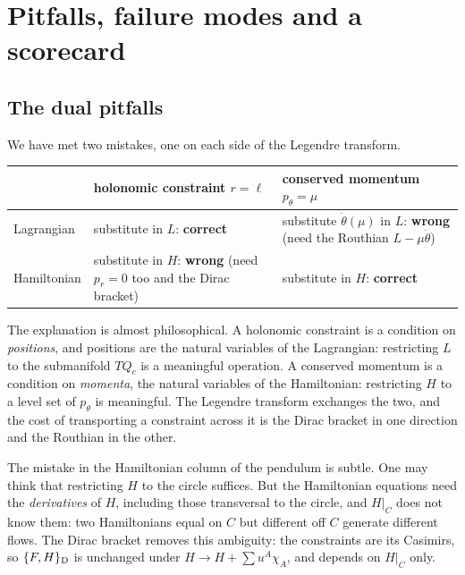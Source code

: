 \section{Pitfalls, failure modes and a scorecard}\label{rd:sec:dual}

\subsection{The dual pitfalls}\label{rd:sec:pitfalls}

We have met two mistakes, one on each side of the Legendre transform.

\begin{center}
\renewcommand{\arraystretch}{1.3}
\begin{tabular}{l|p{4.9cm}|p{4.9cm}}
 & holonomic constraint $r=\ell$ & conserved momentum $p_\theta=\mu$\\ \hline
Lagrangian & substitute in $L$: \textbf{correct} & substitute $\dot\theta(\mu)$ in $L$: \textbf{wrong} (need the Routhian $L-\mu\dot\theta$)\\ \hline
Hamiltonian & substitute in $H$: \textbf{wrong} (need $p_r=0$ too and the Dirac bracket) & substitute in $H$: \textbf{correct}
\end{tabular}
\end{center}

The explanation is almost philosophical. A holonomic constraint is a condition on \emph{positions}, and positions are the natural variables of the Lagrangian: restricting $L$ to the submanifold $TQ_c$ is a meaningful operation. A conserved momentum is a condition on \emph{momenta}, the natural variables of the Hamiltonian: restricting $H$ to a level set of $p_\theta$ is meaningful. The Legendre transform exchanges the two, and the cost of transporting a constraint across it is the Dirac bracket in one direction and the Routhian in the other.

The mistake in the Hamiltonian column of the pendulum is subtle. One may think that restricting $H$ to the circle suffices. But the Hamiltonian equations need the \emph{derivatives} of $H$, including those transversal to the circle, and $H|_C$ does not know them: two Hamiltonians equal on $C$ but different off $C$ generate different flows. The Dirac bracket removes this ambiguity: the constraints are its Casimirs, so $\{F,H\}_{\mathrm D}$ is unchanged under $H\to H+\sum u^A\chi_A$, and depends on $H|_C$ only.

